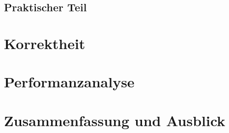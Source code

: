 \documentclass[course=erap]{aspdoc}
\begin{document}
\subsection{Praktischer Teil}
\section{Korrektheit}


\section{Performanzanalyse}


\section{Zusammenfassung und Ausblick}


{}
\cite{intel2017man}
\end{document}
